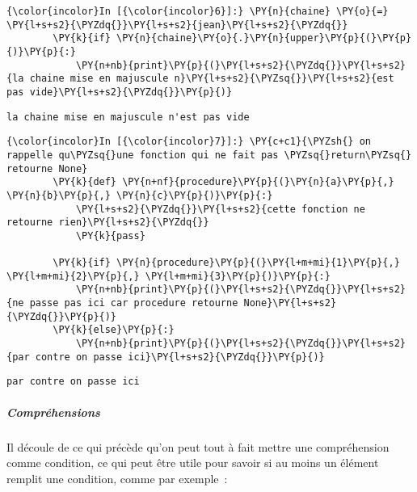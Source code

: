     \begin{Verbatim}[commandchars=\\\{\}]
{\color{incolor}In [{\color{incolor}6}]:} \PY{n}{chaine} \PY{o}{=} \PY{l+s+s2}{\PYZdq{}}\PY{l+s+s2}{jean}\PY{l+s+s2}{\PYZdq{}}
        \PY{k}{if} \PY{n}{chaine}\PY{o}{.}\PY{n}{upper}\PY{p}{(}\PY{p}{)}\PY{p}{:}
            \PY{n+nb}{print}\PY{p}{(}\PY{l+s+s2}{\PYZdq{}}\PY{l+s+s2}{la chaine mise en majuscule n}\PY{l+s+s2}{\PYZsq{}}\PY{l+s+s2}{est pas vide}\PY{l+s+s2}{\PYZdq{}}\PY{p}{)}
\end{Verbatim}


    \begin{Verbatim}[commandchars=\\\{\}]
la chaine mise en majuscule n'est pas vide

    \end{Verbatim}

    \begin{Verbatim}[commandchars=\\\{\}]
{\color{incolor}In [{\color{incolor}7}]:} \PY{c+c1}{\PYZsh{} on rappelle qu\PYZsq{}une fonction qui ne fait pas \PYZsq{}return\PYZsq{} retourne None}
        \PY{k}{def} \PY{n+nf}{procedure}\PY{p}{(}\PY{n}{a}\PY{p}{,} \PY{n}{b}\PY{p}{,} \PY{n}{c}\PY{p}{)}\PY{p}{:}
            \PY{l+s+s2}{\PYZdq{}}\PY{l+s+s2}{cette fonction ne retourne rien}\PY{l+s+s2}{\PYZdq{}}
            \PY{k}{pass}
        
        \PY{k}{if} \PY{n}{procedure}\PY{p}{(}\PY{l+m+mi}{1}\PY{p}{,} \PY{l+m+mi}{2}\PY{p}{,} \PY{l+m+mi}{3}\PY{p}{)}\PY{p}{:}
            \PY{n+nb}{print}\PY{p}{(}\PY{l+s+s2}{\PYZdq{}}\PY{l+s+s2}{ne passe pas ici car procedure retourne None}\PY{l+s+s2}{\PYZdq{}}\PY{p}{)}
        \PY{k}{else}\PY{p}{:}
            \PY{n+nb}{print}\PY{p}{(}\PY{l+s+s2}{\PYZdq{}}\PY{l+s+s2}{par contre on passe ici}\PY{l+s+s2}{\PYZdq{}}\PY{p}{)}
\end{Verbatim}


    \begin{Verbatim}[commandchars=\\\{\}]
par contre on passe ici

    \end{Verbatim}

    \hypertarget{compruxe9hensions}{%
\subparagraph{Compréhensions}\label{compruxe9hensions}}

    Il découle de ce qui précède qu'on peut tout à fait mettre une
compréhension comme condition, ce qui peut être utile pour savoir si au
moins un élément remplit une condition, comme par exemple~:

